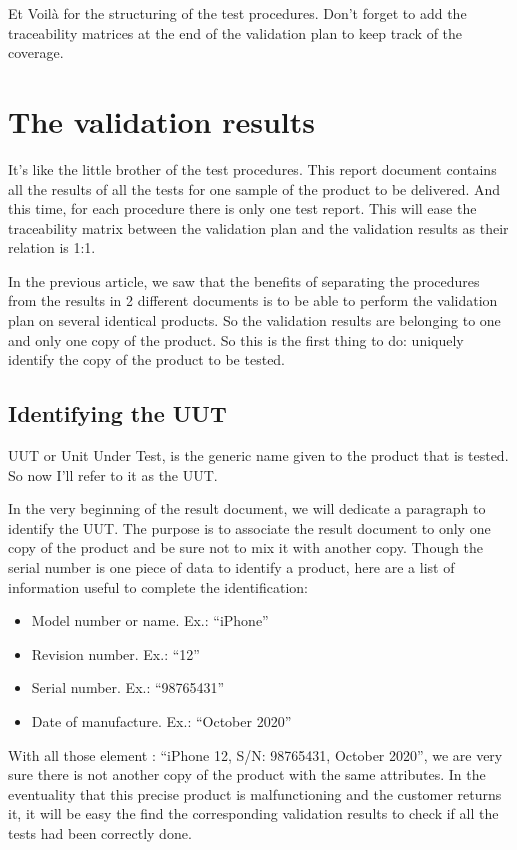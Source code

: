 Et Voilà for the structuring of the test procedures. Don’t forget to add the traceability matrices at the end of the validation plan to keep track of the coverage.

\section{The validation results}
It’s like the little brother of the test procedures. This report document contains all the results of all the tests for one sample of the product to be delivered. And this time, for each procedure there is only one test report. This will ease the traceability matrix between the validation plan and the validation results as their relation is 1:1.

In the previous article, we saw that the benefits of separating the procedures from the results in 2 different documents is to be able to perform the validation plan on several identical products. So the validation results are belonging to one and only one copy of the product. So this is the first thing to do: uniquely identify the copy of the product to be tested.

\subsection{Identifying the UUT}
UUT or Unit Under Test, is the generic name given to the product that is tested. So now I’ll refer to it as the UUT.

In the very beginning of the result document, we will dedicate a paragraph to identify the UUT. The purpose is to associate the result document to only one copy of the product and be sure not to mix it with another copy. Though the serial number is one piece of data to identify a product, here are a list of information useful to complete the identification:

\begin{itemize}
    \item Model number or name. Ex.: “iPhone”
    \item Revision number. Ex.: “12”
    \item Serial number. Ex.: “98765431”
    \item Date of manufacture. Ex.: “October 2020”
\end{itemize}

With all those element : “iPhone 12, S/N: 98765431, October 2020”, we are very sure there is not another copy of the product with the same attributes.
In the eventuality that this precise product is malfunctioning and the customer returns it, it will be easy the find the corresponding validation results to check if all the tests had been correctly done.

